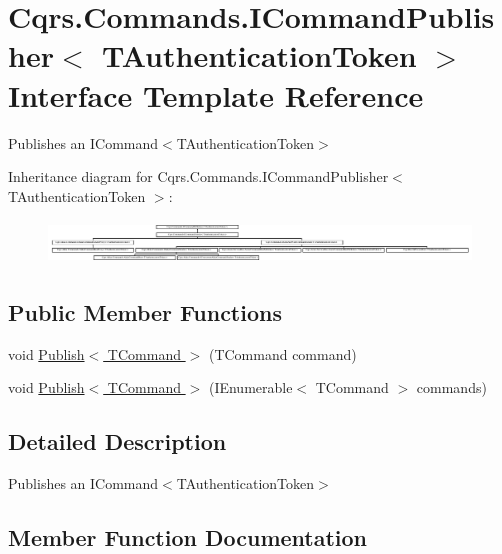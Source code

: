 \hypertarget{interfaceCqrs_1_1Commands_1_1ICommandPublisher}{}\section{Cqrs.\+Commands.\+I\+Command\+Publisher$<$ T\+Authentication\+Token $>$ Interface Template Reference}
\label{interfaceCqrs_1_1Commands_1_1ICommandPublisher}


Publishes an I\+Command$<$\+T\+Authentication\+Token$>$  


Inheritance diagram for Cqrs.\+Commands.\+I\+Command\+Publisher$<$ T\+Authentication\+Token $>$\+:\begin{figure}[H]
\begin{center}
\leavevmode
\includegraphics[height=1.159420cm]{interfaceCqrs_1_1Commands_1_1ICommandPublisher}
\end{center}
\end{figure}
\subsection*{Public Member Functions}
\begin{DoxyCompactItemize}
\item 
void \hyperlink{interfaceCqrs_1_1Commands_1_1ICommandPublisher_aeeb487ad5686d9c44d214b1daaf7833a_aeeb487ad5686d9c44d214b1daaf7833a}{Publish$<$ T\+Command $>$} (T\+Command command)
\item 
void \hyperlink{interfaceCqrs_1_1Commands_1_1ICommandPublisher_af0f033c0b949e5650032e4f00b11b595_af0f033c0b949e5650032e4f00b11b595}{Publish$<$ T\+Command $>$} (I\+Enumerable$<$ T\+Command $>$ commands)
\end{DoxyCompactItemize}


\subsection{Detailed Description}
Publishes an I\+Command$<$\+T\+Authentication\+Token$>$ 



\subsection{Member Function Documentation}
\mbox{\label{interfaceCqrs_1_1Commands_1_1ICommandPublisher_aeeb487ad5686d9c44d214b1daaf7833a_aeeb487ad5686d9c44d214b1daaf7833a}} 
